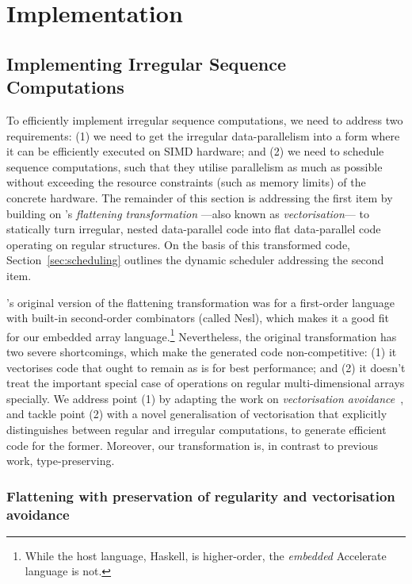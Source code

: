 \chapter{Implementation}
\section{Implementing Irregular Sequence Computations}
\label{sec:executing_sequence_computations}
\label{sec:Vectorisation}

To efficiently implement irregular sequence computations, we need to address two requirements: (1) we need to get the irregular data-parallelism into a form where it can be efficiently executed on SIMD hardware; and (2) we need to schedule sequence computations, such that they utilise parallelism as much as possible without exceeding the resource constraints (such as memory limits) of the concrete hardware. The remainder of this section is addressing the first item by building on \citet{Blelloch:compiling1988}'s \emph{flattening transformation} ---also known as \emph{vectorisation}--- to statically turn irregular, nested data-parallel code into flat data-parallel code operating on regular structures. On the basis of this transformed code, Section~\ref{sec:scheduling} outlines the dynamic scheduler addressing the second item.

\citet{Blelloch:compiling1988}'s original version of the flattening transformation was for a first-order language with built-in second-order combinators (called Nesl), which makes it a good fit for our embedded array language.\footnote{While the host language, Haskell, is higher-order, the \emph{embedded} Accelerate language is not.} Nevertheless, the original transformation has two severe shortcomings, which make the generated code non-competitive: (1) it vectorises code that ought to remain as is for best performance; and (2) it doesn't treat the important special case of operations on regular multi-dimensional arrays specially. We address point (1) by adapting the work on \emph{vectorisation avoidance}~\citep{Keller:avoidance}, and tackle point (2) with a novel generalisation of vectorisation that explicitly distinguishes between regular and irregular computations, to generate efficient code for the former. Moreover, our transformation is, in contrast to previous work, type-preserving.

\subsection{Flattening with preservation of regularity and vectorisation avoidance}
\label{sec:flattening}

